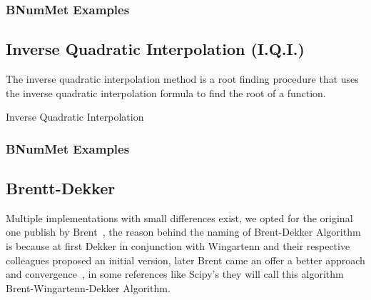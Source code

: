 \subsubsection*{BNumMet Examples}



\subsection*{Inverse Quadratic Interpolation (I.Q.I.)}
The inverse quadratic interpolation method is a root finding procedure that uses the inverse quadratic interpolation formula to find the root of a function. 

\begin{algorithm}[H]
\label{alg:IQI Method}

\SetAlgoLined

     \caption{Inverse Quadratic Interpolation}
     
\end{algorithm}
\subsubsection*{BNumMet Examples}


\subsection*{Brentt-Dekker}
Multiple implementations with small differences exist, we opted for the original one publish by Brent~\cite{brent2002algorithms}, the reason behind the naming of Brent-Dekker Algorithm is because at first Dekker in conjunction with Wingartenn and their respective colleagues proposed an initial version, later Brent came an offer a better approach and convergence~\cite{Press2007}, in some references like Scipy's they will call this algorithm Brent-Wingartenn-Dekker Algorithm.


